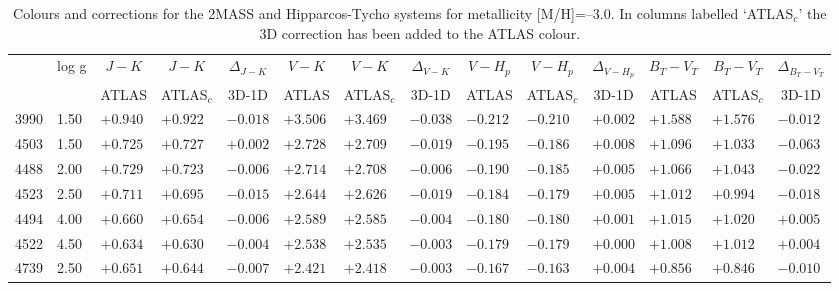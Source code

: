 \documentclass[]{aa}
\def\teff{$T\rm_{eff}$}
\begin{document}
\begin{appendix}
\begin{table*}
\caption{\label{2masshipm30}
Colours and corrections for the 2MASS and Hipparcos-Tycho systems for metallicity [M/H]=--3.0. In columns labelled `ATLAS$_c$' the 3D correction
has been added to the ATLAS colour. }
\renewcommand{\tabcolsep}{3pt}
\tabskip=0pt
\begin{center}
\begin{tabular}{llllllllllllll}
\hline\noalign{\smallskip}
\multicolumn{1}{c}{\teff} & 
\multicolumn{1}{c}{log g} & 
\multicolumn{1}{c}{$J-K$} &
\multicolumn{1}{c}{$J-K$} &
\multicolumn{1}{c}{$\Delta_{J-K}$} &
\multicolumn{1}{c}{$V-K$} &
\multicolumn{1}{c}{$V-K$} &
\multicolumn{1}{c}{$\Delta_{V-K}$} &
\multicolumn{1}{c}{$V-H_p$} &
\multicolumn{1}{c}{$V-H_p$} &
\multicolumn{1}{c}{$\Delta_{V-H_p}$} &
\multicolumn{1}{c}{$B_T-V_T$} &
\multicolumn{1}{c}{$B_T-V_T$} &
\multicolumn{1}{c}{$\Delta_{B_T-V_T}$} \\
\multicolumn{2}{c}{ } &  
\multicolumn{1}{c}{ATLAS} &
\multicolumn{1}{c}{ATLAS$_c$}&
\multicolumn{1}{c}{3D-1D}&
\multicolumn{1}{c}{ATLAS} &
\multicolumn{1}{c}{ATLAS$_c$}&
\multicolumn{1}{c}{3D-1D}&
\multicolumn{1}{c}{ATLAS} &
\multicolumn{1}{c}{ATLAS$_c$}&
\multicolumn{1}{c}{3D-1D}&
\multicolumn{1}{c}{ATLAS} &
\multicolumn{1}{c}{ATLAS$_c$}&
\multicolumn{1}{c}{3D-1D} \\
\hline\noalign{\smallskip}
\hline\noalign{\smallskip}
3990  &1.50 &$ +0.940$ &$ +0.922$ &$ -0.018$ &$ +3.506$ &$ +3.469$ &$ -0.038$ &$ -0.212$ &$ -0.210$ &$ +0.002$ &$ +1.588$ &$ +1.576$ &$ -0.012$\\
4503  &1.50 &$ +0.725$ &$ +0.727$ &$ +0.002$ &$ +2.728$ &$ +2.709$ &$ -0.019$ &$ -0.195$ &$ -0.186$ &$ +0.008$ &$ +1.096$ &$ +1.033$ &$ -0.063$\\
4488  &2.00 &$ +0.729$ &$ +0.723$ &$ -0.006$ &$ +2.714$ &$ +2.708$ &$ -0.006$ &$ -0.190$ &$ -0.185$ &$ +0.005$ &$ +1.066$ &$ +1.043$ &$ -0.022$\\
4523  &2.50 &$ +0.711$ &$ +0.695$ &$ -0.015$ &$ +2.644$ &$ +2.626$ &$ -0.019$ &$ -0.184$ &$ -0.179$ &$ +0.005$ &$ +1.012$ &$ +0.994$ &$ -0.018$\\
4494  &4.00 &$ +0.660$ &$ +0.654$ &$ -0.006$ &$ +2.589$ &$ +2.585$ &$ -0.004$ &$ -0.180$ &$ -0.180$ &$ +0.001$ &$ +1.015$ &$ +1.020$ &$ +0.005$\\
4522  &4.50 &$ +0.634$ &$ +0.630$ &$ -0.004$ &$ +2.538$ &$ +2.535$ &$ -0.003$ &$ -0.179$ &$ -0.179$ &$ +0.000$ &$ +1.008$ &$ +1.012$ &$ +0.004$\\
4739  &2.50 &$ +0.651$ &$ +0.644$ &$ -0.007$ &$ +2.421$ &$ +2.418$ &$ -0.003$ &$ -0.167$ &$ -0.163$ &$ +0.004$ &$ +0.856$ &$ +0.846$ &$ -0.010$\\

\end{tabular}
\end{center}
\end{table*}
\end{appendix}
\end{document}
